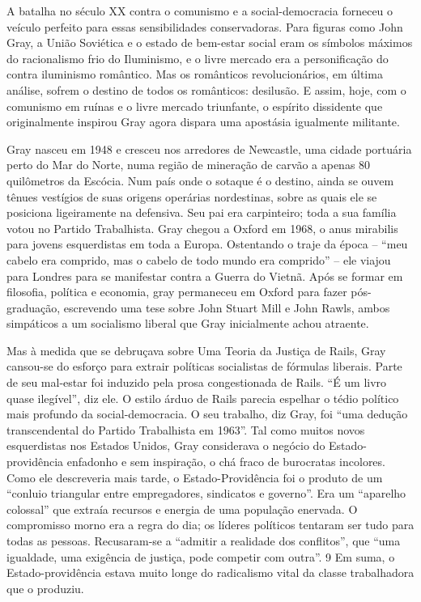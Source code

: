  
\par
 
A batalha no século XX contra o comunismo e a social-democracia forneceu o veículo perfeito para essas sensibilidades conservadoras. Para figuras como John Gray, a União Soviética e o estado de bem-estar social eram os símbolos máximos do racionalismo frio do Iluminismo, e o livre mercado era a personificação do contra iluminismo romântico. Mas os românticos revolucionários, em última análise, sofrem o destino de todos os românticos: desilusão. E assim, hoje, com o comunismo em ruínas e o livre mercado triunfante, o espírito dissidente que originalmente inspirou Gray agora dispara uma apostásia igualmente militante.
 
\par
 
Gray nasceu em 1948 e cresceu nos arredores de Newcastle, uma cidade portuária perto do Mar do Norte, numa região de mineração de carvão a apenas 80 quilômetros da Escócia. Num país onde o sotaque é o destino, ainda se ouvem tênues vestígios de suas origens operárias nordestinas, sobre as quais ele se posiciona ligeiramente na defensiva. Seu pai era carpinteiro; toda a sua família votou no Partido Trabalhista. Gray chegou a Oxford em 1968, o anus mirabilis para jovens esquerdistas em toda a Europa. Ostentando o traje da época – “meu cabelo era comprido, mas o cabelo de todo mundo era comprido” – ele viajou para Londres para se manifestar contra a Guerra do Vietnã. Após se formar em filosofia, política e economia, gray permaneceu em Oxford para fazer pós-graduação, escrevendo uma tese sobre John Stuart Mill e John Rawls, ambos simpáticos a um socialismo liberal que Gray inicialmente achou atraente.
 
\par
 
Mas à medida que se debruçava sobre Uma Teoria da Justiça de Rails, Gray cansou-se do esforço para extrair políticas socialistas de fórmulas liberais. Parte de seu mal-estar foi induzido pela prosa congestionada de Rails. “É um livro quase ilegível”, diz ele. O estilo árduo de Rails parecia espelhar o tédio político mais profundo da social-democracia. O seu trabalho, diz Gray, foi “uma dedução transcendental do Partido Trabalhista em 1963”. Tal como muitos novos esquerdistas nos Estados Unidos, Gray considerava o negócio do Estado-providência enfadonho e sem inspiração, o chá fraco de burocratas incolores. Como ele descreveria mais tarde, o Estado-Providência foi o produto de um “conluio triangular entre empregadores, sindicatos e governo”. Era um “aparelho colossal” que extraía recursos e energia de uma população enervada. O compromisso morno era a regra do dia; os líderes políticos tentaram ser tudo para todas as pessoas. Recusaram-se a “admitir a realidade dos conflitos”, que “uma igualdade, uma exigência de justiça, pode competir com outra”.
 {\color{blue} 9}  
Em suma, o Estado-providência estava muito longe do radicalismo vital da classe trabalhadora que o produziu.
 
